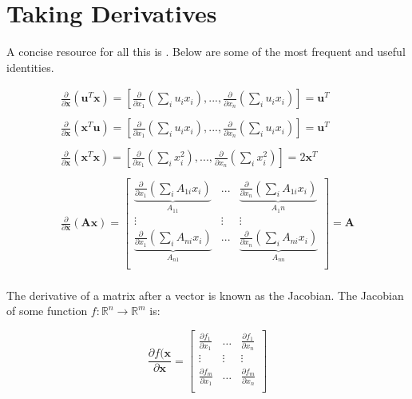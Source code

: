 \section{Taking Derivatives}

A concise resource for all this is . Below are some of the most frequent and useful identities.  

\begin{equation}
\begin{array}{l}
\frac{\partial }{\partial \mathbf{x}} \left(\mathbf{u}^T\mathbf{x}\right) = \left[\frac{\partial }{\partial x_1}\left(\sum_i u_i x_i\right),...,\frac{\partial }{\partial x_n}\left(\sum_i u_i x_i\right)\right] = \mathbf{u}^T\\
\\
\frac{\partial }{\partial \mathbf{x}} \left(\mathbf{x}^T\mathbf{u}\right) = \left[\frac{\partial }{\partial x_1}\left(\sum_i u_i x_i\right),...,\frac{\partial }{\partial x_n}\left(\sum_i u_i x_i\right)\right] = \mathbf{u}^T\\
\\
\frac{\partial }{\partial \mathbf{x}} \left(\mathbf{x}^T\mathbf{x}\right) = \left[\frac{\partial }{\partial x_1}\left(\sum_i x_i^2\right),...,\frac{\partial }{\partial x_n}\left(\sum_i x_i^2\right)\right] = 2\mathbf{x}^T\\
\\
\frac{\partial }{\partial \mathbf{x}} \left(\mathbf{Ax}\right) = \left[
\begin{array}{ccc} 
\underbrace{\frac{\partial }{\partial x_1}\left(\sum_i A_{1i} x_i\right)}_{A_{11}} &...& \underbrace{\frac{\partial }{\partial x_n}\left(\sum_i A_{1i} x_i\right)}_{A_1n}\\
\vdots&\vdots&\vdots\\
\underbrace{\frac{\partial }{\partial x_1}\left(\sum_i A_{ni} x_i\right)}_{A_{n1}} &...& \underbrace{\frac{\partial }{\partial x_n}\left(\sum_i A_{ni} x_i\right)}_{A_{nn}}\\
\end{array}\right] = \mathbf{A}\\
\end{array}
\end{equation}

The derivative of a matrix after a vector is known as the Jacobian. The Jacobian of some function $f: \mathbb{R}^n \rightarrow \mathbb{R}^m$ is:

\begin{equation}
\frac{\partial  f(\mathbf{x}}{\partial \mathbf{x}}=\left[\begin{array}{ccc}
\frac{\partial  f_1}{\partial  x_1} & \hdots & \frac{\partial  f_1}{\partial  x_n} \\
\vdots & \vdots & \vdots \\
\frac{\partial  f_m}{\partial  x_1} & \hdots & \frac{\partial  f_m}{\partial  x_n} \\
\end{array}\right]
\end{equation}
